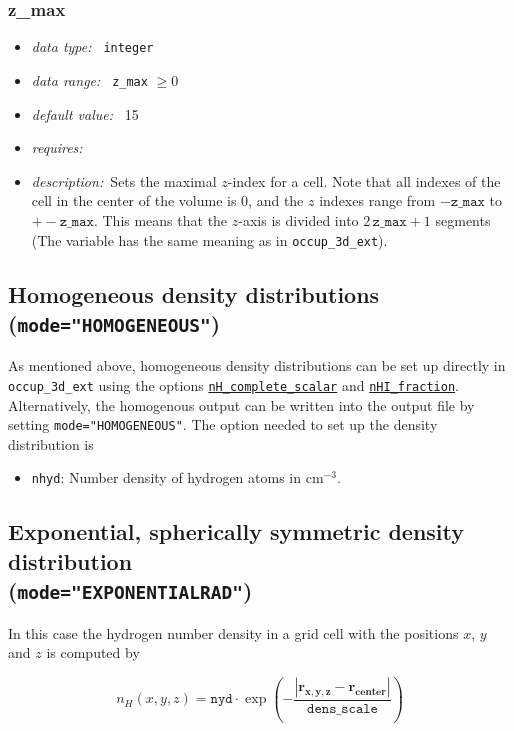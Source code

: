 \documentclass[a4paper,10pt]{article}
\begin{document}
\subsubsection{z\_max}
\label{hydopt:zmax}
\begin{itemize}
 \item \textit{data type:~} \texttt{integer}
 \item \textit{data range:~} \texttt{z\_max} $\ge0$
 \item \textit{default value:~} 15
 \item \textit{requires:~}
 \item \textit{description:~}Sets the maximal $z$-index for a cell. Note that
  all indexes of the cell in the center of the volume is 0, and the  $z$ 
  indexes range from $-\mathtt{z\_max}$ to $+-\mathtt{z\_max}$. This means that 
  the $z$-axis is divided into $2\, \mathtt{z\_max} +1$ segments (The variable 
  has the same meaning as in \texttt{occup\_3d\_ext}).
\end{itemize}


\subsection{Homogeneous density distributions (\texttt{mode="HOMOGENEOUS"})} 
As mentioned above, homogeneous density distributions can be set up directly in 
\texttt{occup\_3d\_ext} using the options 
\hyperref[opt:nhcompletescalar]{\texttt{nH\_complete\_scalar}} and
\hyperref[opt:nhifraction]{\texttt{nHI\_fraction}}. Alternatively, the 
homogenous output can be written into the output file by setting 
\texttt{mode="HOMOGENEOUS"}.
The option needed to set up the density distribution is 
\begin{itemize}
 \item \texttt{nhyd}: Number density of hydrogen atoms in $\mathrm{cm}^{-3}$.  
\end{itemize}

\subsection{Exponential, spherically symmetric density distribution\\ 
(\texttt{mode="EXPONENTIALRAD"})}
In this case the hydrogen number density in a grid cell with the positions $x$, 
$y$ and $z$ is computed by

\begin{equation}
 n_H(x,y,z) = \mathtt{nyd} \cdot \exp\left(- \frac{\left|\mathbf{r_{x,y,z}} - 
\mathbf{r_{center}} \right|}{\mathtt{dens\_scale}}\right)
\end{equation}
\end{document}
